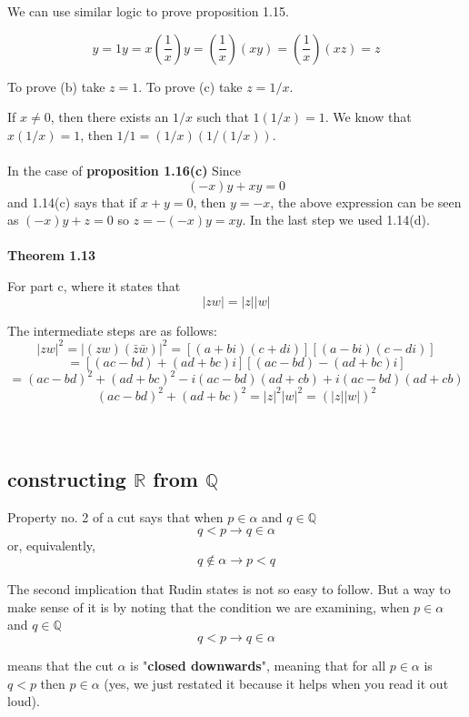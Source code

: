 We can use similar logic to prove proposition 1.15.

$$
y = 1y = x \left(\frac{1}{x}\right) y = \left(\frac{1}{x}\right) (xy)
= \left(\frac{1}{x}\right) (xz) = z
$$

To prove (b) take $z=1$.
To prove (c) take $z = 1/x$.

If $x\neq 0$, then there exists an $1/x$ such that $1 (1/x) = 1$.
We know that $x(1/x) = 1$, then $1/1 = (1/x)(1/(1/x))$.
\\~\\

In the case of \textbf{proposition 1.16(c)}
Since
$$
(-x)y + xy = 0
$$
and 1.14(c) says that if $x+y = 0$, then $y=-x$, the above expression can be seen as $(-x)y + z = 0$
so $z = -(-x)y = xy$.
In the last step we used 1.14(d).
\\~\\


\textbf{Theorem 1.13}

For part c, where it states that
$$
|zw| = |z| |w|
$$

The intermediate steps are as follows:
$$
|zw|^2 = |(zw)(\bar{z}\bar{w})|^2 = \left[ (a+bi)(c+di) \right] \left[ (a-bi)(c-di) \right] 
$$
$$
= \left[ (ac - bd) + (ad + bc)i \right] \left[ (ac - bd) - (ad + bc)i \right]
$$
$$
= (ac - bd)^2 + (ad + bc)^2 - i(ac - bd)(ad + cb) + i(ac - bd)(ad + cb)
$$
$$
(ac - bd)^2 + (ad + bc)^2 = |z|^2 |w|^2 = \left( |z||w| \right)^2
$$
\\~\\



\subsection{constructing $\mathbb{R}$ from $\mathbb{Q}$}

Property no. 2 of a cut says that when $p\in\alpha$ and $q\in\mathbb{Q}$
$$
q < p \rightarrow q\in\alpha
$$
or, equivalently,
$$
q\notin\alpha \rightarrow p < q
$$

The second implication that Rudin states is not so easy to follow.
But a way to make sense of it is by noting that the condition we are examining,
when $p\in\alpha$ and $q\in\mathbb{Q}$
$$
q < p \rightarrow q\in\alpha
$$

means that the cut $\alpha$ is "\textbf{closed downwards}", meaning that for all
$p\in\alpha$ is $q < p$ then $p\in\alpha$ (yes, we just restated it because it helps when you read it out loud).

